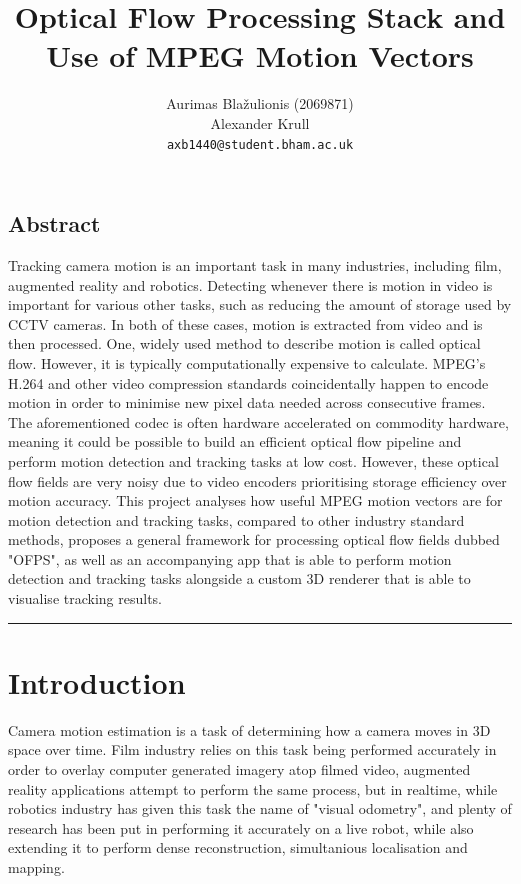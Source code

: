 \documentclass[11pt,english]{report}
\author{
	Aurimas Blažulionis (2069871)\\
	Alexander Krull\\
	\texttt{axb1440@student.bham.ac.uk}
}
\title{Optical Flow Processing Stack and Use of MPEG Motion Vectors}
\begin{document}
\maketitle

\section*{Abstract}

Tracking camera motion is an important task in many industries, including film, augmented reality and robotics. Detecting whenever there is motion in video is important for various other tasks, such as reducing the amount of storage used by CCTV cameras. In both of these cases, motion is extracted from video and is then processed. One, widely used method to describe motion is called optical flow. However, it is typically computationally expensive to calculate. MPEG's H.264 and other video compression standards coincidentally happen to encode motion in order to minimise new pixel data needed across consecutive frames. The aforementioned codec is often hardware accelerated on commodity hardware, meaning it could be possible to build an efficient optical flow pipeline and perform motion detection and tracking tasks at low cost. However, these optical flow fields are very noisy due to video encoders prioritising storage efficiency over motion accuracy. This project analyses how useful MPEG motion vectors are for motion detection and tracking tasks, compared to other industry standard methods, proposes a general framework for processing optical flow fields dubbed "OFPS", as well as an accompanying app that is able to perform motion detection and tracking tasks alongside a custom 3D renderer that is able to visualise tracking results.

\tableofcontents

\par\noindent\rule{\textwidth}{0.4pt}

\chapter{Introduction}

Camera motion estimation is a task of determining how a camera moves in 3D space over time. Film industry relies on this task being performed accurately in order to overlay computer generated imagery atop filmed video, augmented reality applications attempt to perform the same process, but in realtime, while robotics industry has given this task the name of "visual odometry", and plenty of research has been put in performing it accurately on a live robot, while also extending it to perform dense reconstruction, simultanious localisation and mapping.
\end{document}
